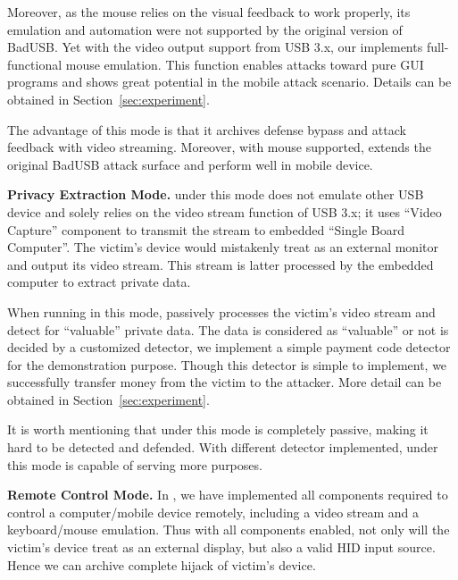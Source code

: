 Moreover, as the mouse relies on the visual feedback to work properly, its
emulation and automation were not supported by the original version of BadUSB.
Yet with the video output support from USB 3.x, our \tool implements
full-functional mouse emulation. This function enables attacks toward pure GUI
programs and shows great potential in the mobile attack scenario. Details can
be obtained in Section~\ref{sec:experiment}.

The advantage of this mode is that it archives defense bypass and attack
feedback with video streaming.  
Moreover, with mouse
supported, \tool extends the original BadUSB attack surface and perform well in
mobile device.

\textbf{Privacy Extraction Mode.} \tool under this mode does not emulate other
USB device and solely relies on the video stream function of USB 3.x; it uses
``Video Capture'' component to transmit the stream to embedded ``Single Board Computer''. The victim's device would mistakenly treat \tool as an external monitor
and output its video stream. This stream is latter processed by the embedded
computer to extract private data.

When running in this mode, \tool passively processes the victim's video stream
and detect for ``valuable'' private data.  The data is considered as
``valuable'' or not is decided by a customized detector, we implement a simple
payment code detector for the demonstration purpose. Though this detector is
simple to implement, we successfully transfer money from the victim to the
attacker. More detail can be obtained in Section~\ref{sec:experiment}.

It is worth mentioning that \tool under this mode is completely passive, making
it hard to be detected and defended. With different detector implemented, \tool
under this mode is capable of serving more purposes.

\textbf{Remote Control Mode.} In \tool, we have implemented all components
required to control a computer/mobile device remotely, including a video stream
and a keyboard/mouse emulation. Thus with all components enabled, not only will
the victim's device treat \tool as an external display, but also a valid HID
input source. Hence we can archive complete hijack of victim's device.

